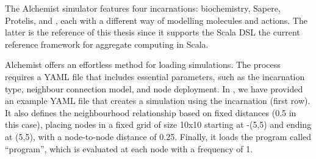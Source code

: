  The Alchemist simulator features four incarnations: 
  biochemistry, Sapere, Protelis, and \scafi{},
  each with a different way of modelling molecules and actions.
The latter is the reference of this thesis since it supports the \scafi{} Scala DSL
 the current reference framework for aggregate computing in Scala.

Alchemist offers an effortless method for loading simulations. 
 The process requires a YAML file that includes essential parameters, 
 such as the incarnation type, neighbour connection model, and node deployment. 
 In , we have provided an example YAML file 
 that creates a simulation using the \scafi{} incarnation (first row). 
 It also defines the neighbourhood relationship based on fixed distances (0.5 in this case), 
 placing nodes in a fixed grid of size 10x10 starting at -(5,5) and ending at (5,5), 
 with a node-to-node distance of 0.25. 
 Finally, it loads the \scafi{} program called ``program'', 
 which is evaluated at each node with a frequency of 1. 

